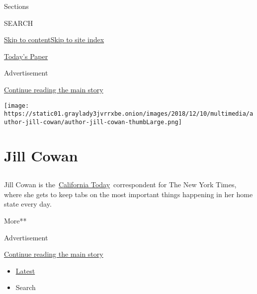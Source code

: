 Sections

SEARCH

\protect\hyperlink{site-content}{Skip to
content}\protect\hyperlink{site-index}{Skip to site index}

\href{https://myaccount.nytimes3xbfgragh.onion/auth/login?response_type=cookie\&client_id=vi}{}

\href{https://www.nytimes3xbfgragh.onion/section/todayspaper}{Today's
Paper}

Advertisement

\protect\hyperlink{after-top}{Continue reading the main story}

\texttt{[image: https://static01.graylady3jvrrxbe.onion/images/2018/12/10/multimedia/author-jill-cowan/author-jill-cowan-thumbLarge.png]}

\hypertarget{jill-cowan}{%
\section{Jill Cowan}\label{jill-cowan}}

\subsection{}

Jill Cowan is
the~\href{https://www.nytimes3xbfgragh.onion/column/california-today}{Californ}\href{https://www.nytimes3xbfgragh.onion/column/california-today}{ia
Today}~correspondent for The New York Times, where she gets to keep tabs
on the most important things happening in her home state every day.

More**

Advertisement

\protect\hyperlink{after-mid1}{Continue reading the main story}

\begin{itemize}
\tightlist
\item
  \protect\hyperlink{stream-panel}{Latest}
\item
  Search
\end{itemize}

